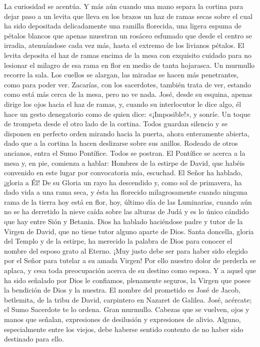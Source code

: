 \documentclass[12pt]{book} %
\begin{document}
La curiosidad se acentúa. Y más aún cuando una mano separa la cortina para dejar paso a un levita que lleva en los brazos un haz de ramas secas sobre el cual ha sido depositada delicadamente una ramilla florecida, una ligera espuma de pétalos blancos que apenas muestran un rosáceo esfumado que desde el centro se irradia, atenuándose cada vez más, hasta el extremo de los livianos pétalos. El levita deposita el haz de ramas encima de la mesa con exquisito cuidado para no lesionar el milagro de esa rama en flor en medio de tanta hojarasca. 
Un murmullo recorre la sala. Los cuellos se alargan, las miradas se hacen más penetrantes, como para poder ver. Zacarías, con los sacerdotes, también trata de ver, estando como está más cerca de la mesa, pero no ve nada. 
José, desde su esquina, apenas dirige los ojos hacia el haz de ramas, y, cuando su interlocutor le dice algo, él hace un 
gesto denegatorio como de quien dice: «¡Imposible!», y sonríe. 
Un toque de trompeta desde el otro lado de la cortina. Todos guardan silencio y se disponen en perfecto orden mirando hacia la  puerta, ahora enteramente abierta, dado que a la cortina la hacen deslizarse sobre sus anillos. Rodeado de otros ancianos, entra el Sumo Pontífice. Todos se postran. El Pontífice se acerca a la mesa y, en  pie, comienza a hablar: 
Hombres de la estirpe de David, que habéis convenido en este lugar por convocatoria mía, escuchad. El Señor ha hablado, ¡gloria a Él! De su Gloria un rayo ha descendido y, como sol de primavera, ha dado vida a una rama seca, y ésta ha florecido milagrosamente cuando ninguna rama de la tierra hoy está en flor, hoy, último día de las Luminarias, cuando aún no se ha derretido la nieve caída sobre las alturas de Judá y es lo único cándido que hay entre Sión y Betania. Dios ha hablado haciéndose padre y tutor de la Virgen de David, que no tiene tutor alguno aparte de Dios. Santa doncella, gloria del Templo y de la estirpe, ha merecido la palabra de Dios para conocer el nombre del esposo grato al Eterno. ¡Muy justo debe ser para haber sido elegido por el Señor para tutelar a su amada Virgen! Por ello nuestro dolor de perderla se aplaca, y cesa toda preocupación acerca de su destino como esposa. Y a aquel que ha sido señalado por Dios le confiamos, plenamente seguros, la Virgen que posee la bendición de Dios y la nuestra. El nombre del prometido es José de Jacob, betlemita, de la tribu de David, carpintero en Nazaret de Galilea. José, acércate; el Sumo Sacerdote te lo ordena. 
Gran murmullo. Cabezas que se vuelven, ojos y manos que señalan, expresiones de desilusión y expresiones de alivio. Alguno, especialmente entre los viejos, debe haberse sentido contento de no haber sido destinado para ello. 
\end{document}
